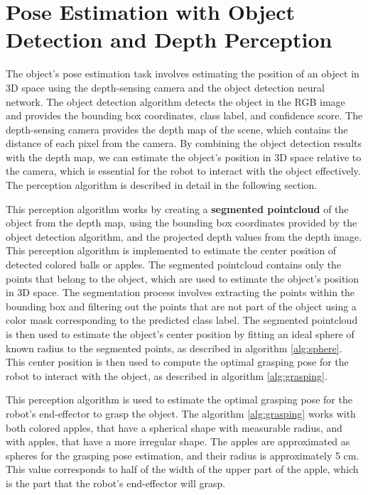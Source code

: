 \section{Pose Estimation with Object Detection and Depth Perception}
\label{sec:perception}

The object's pose estimation task involves estimating the position of an object in 3D space using the depth-sensing
camera and the object detection neural network. The object detection algorithm detects the object 
in the RGB image and provides the bounding box coordinates, class label, and confidence score. 
The depth-sensing camera provides the depth map of the scene, which contains the distance of each pixel from the camera.
By combining the object detection results with the depth map, we can estimate the object's position in 3D space
relative to the camera, which is essential for the robot to interact with the object effectively.
The perception algorithm is described in detail in the following section.

This perception algorithm works by creating a \textbf{segmented pointcloud} of the object from the depth map,
using the bounding box coordinates provided by the object detection algorithm, and the projected depth values
from the depth image. This perception algorithm is implemented to estimate the center position
of detected colored balls or apples.
The segmented pointcloud contains only the points that belong to the object, which are used
to estimate the object's position in 3D space. The segmentation process involves extracting the points within
the bounding box and filtering out the points that are not part of the object using a color mask corresponding
to the predicted class label. The segmented pointcloud is then used to estimate the object's center position
by fitting an ideal sphere of known radius to the segmented points, as described in algorithm \ref{alg:sphere}.
This center position is then used to compute the optimal grasping pose for the robot to interact with the object,
as described in algorithm \ref{alg:grasping}.

This perception algorithm is used to estimate the optimal grasping pose for the robot's end-effector to grasp
the object. The algorithm \ref{alg:grasping} works with both colored apples, that have a spherical shape 
with measurable radius, and with apples, that have a more irregular shape. The apples are approximated as spheres
for the grasping pose estimation, and their radius is approximately 5 cm. This value corresponds to half of the
width of the upper part of the apple, which is the part that the robot's end-effector will grasp.

